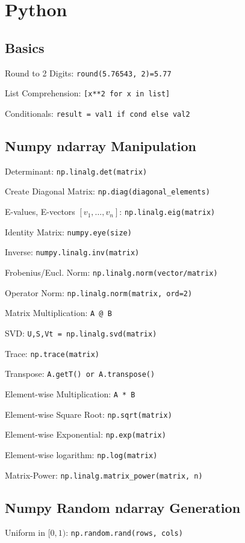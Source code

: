 \section*{Python}
\subsection*{Basics}
Round to 2 Digits: {\color{blue} \verb|round(5.76543, 2)=5.77|}

List Comprehension: {\color{blue}\verb|[x**2 for x in list]|}

Conditionals: {\color{blue}\verb|result = val1 if cond else val2|}

\subsection*{Numpy ndarray Manipulation}
Determinant: {\color{blue}\verb|np.linalg.det(matrix)|}

Create Diagonal Matrix: {\color{blue}\verb|np.diag(diagonal_elements)|}

E-values, E-vectors $[v_1, \ldots, v_n]$: {\color{blue}\verb|np.linalg.eig(matrix)|}

Identity Matrix: {\color{blue}\verb|numpy.eye(size)|}

Inverse: {\color{blue}\verb|numpy.linalg.inv(matrix)|}

Frobenius/Eucl. Norm: {\color{blue}\verb|np.linalg.norm(vector/matrix)|}

Operator Norm:
{\color{blue}\verb|np.linalg.norm(matrix, ord=2)|}

Matrix Multiplication: {\color{blue}\verb|A @ B|}

SVD: {\color{blue}\verb|U,S,Vt = np.linalg.svd(matrix)|}

Trace: {\color{blue}\verb|np.trace(matrix)|}

Transpose: {\color{blue}\verb|A.getT() or A.transpose()|}

Element-wise Multiplication: {\color{blue}\verb|A * B|}

Element-wise Square Root: {\color{blue}\verb|np.sqrt(matrix)|}

Element-wise Exponential: {\color{blue}\verb|np.exp(matrix)|}

Element-wise logarithm: {\color{blue}\verb|np.log(matrix)|}

Matrix-Power:
{\color{blue}\verb|np.linalg.matrix_power(matrix, n)|}

\subsection*{Numpy Random ndarray Generation}
Uniform in $[0,1)$: {\color{blue}\verb|np.random.rand(rows, cols)|}

